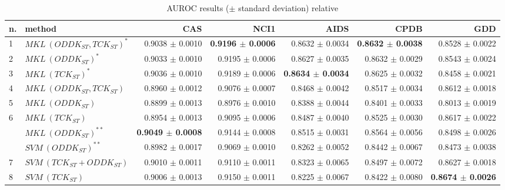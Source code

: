 \begin{landscape}

    \begin{table}[ht]\footnotesize
        \centering
        \begin{tabular}{|l|l|r|r|r|r|r|}
            \hline
            n. &method&CAS&NCI1&AIDS&CPDB&GDD\\
            \hline
            1& $MKL~(ODDK_{ST}, TCK_{ST})^*$&0.9038 $\pm$ 0.0010&\textbf{0.9196 $\pm$ 0.0006}&0.8632 $\pm$ 0.0034&\textbf{0.8632 $\pm$ 0.0038}&0.8528 $\pm$ 0.0022\\
            2& $MKL~(ODDK_{ST})^*$&0.9033 $\pm$ 0.0010&0.9195 $\pm$ 0.0006&0.8627 $\pm$ 0.0035&0.8632 $\pm$  0.0029&0.8543 $\pm$ 0.0024\\
            3& $MKL~(TCK_{ST})^*$&0.9036 $\pm$ 0.0010&0.9189 $\pm$ 0.0006&\textbf{0.8634 $\pm$ 0.0034}&0.8625 $\pm$ 0.0032&0.8458 $\pm$ 0.0021\\
            \hline
            4& $MKL~(ODDK_{ST}, TCK_{ST})$&0.8960 $\pm$  0.0012&0.9076 $\pm$ 0.0007&0.8468 $\pm$ 0.0042&0.8517 $\pm$ 0.0034&0.8612 $\pm$ 0.0018\\
            5& $MKL~(ODDK_{ST})$&0.8899 $\pm$ 0.0013&0.8976 $\pm$ 0.0010 &0.8388 $\pm$ 0.0044&0.8401 $\pm$ 0.0033&0.8013 $\pm$ 0.0019\\
            6& $MKL~(TCK_{ST})$&0.8954 $\pm$ 0.0013&0.9095 $\pm$ 0.0006&0.8487 $\pm$ 0.0040&0.8525 $\pm$ 0.0030&0.8617 $\pm$ 0.0022\\
            \hline
             & $MKL~(ODDK_{ST})^{**}$&\textbf{0.9049 $\pm$ 0.0008}&0.9144 $\pm$ 0.0008&0.8515 $\pm$ 0.0031&0.8564 $\pm$ 0.0056&0.8498 $\pm$ 0.0026\\
             & $SVM~(ODDK_{ST})^{**}$&0.8982 $\pm$ 0.0017&0.9069 $\pm$ 0.0010&0.8262 $\pm$ 0.0052&0.8442 $\pm$ 0.0067&0.8473 $\pm$ 0.0038\\
            \hline
            7& $SVM~(TCK_{ST} + ODDK_{ST})$&0.9010 $\pm$ 0.0011&0.9110 $\pm$ 0.0011&0.8323 $\pm$ 0.0065&0.8497 $\pm$ 0.0072&0.8627 $\pm$ 0.0018\\
            8& $SVM~(TCK_{ST})$&0.9006 $\pm$ 0.0013&0.9150 $\pm$ 0.0011&0.8225 $\pm$ 0.0067&0.8422 $\pm$ 0.0080&\textbf{0.8674 $\pm$ 0.0026}\\
            \hline
        \end{tabular}
        \caption{\footnotesize AUROC results ($\pm$ standard deviation) relative
}
\end{table}
\end{landscape}
